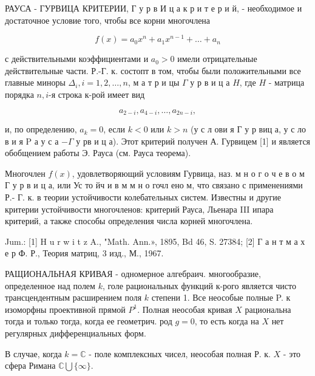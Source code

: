 \documentclass[10pt]{article}
\begin{document}
РАУСА - ГУРВИЦА КРИТЕРИИ, Г у р в И ц а к р и т е р и й, - необходимое и достаточное условие того, чтобы все корни многочлена



\[

f(x)=a_{0} x^{n}+a_{1} x^{n-1}+\ldots+a_{n}

\]



с действительными коэффициентами и $a_{0}>0$ имели отрицательные действительные части. Р.-Г. к. состопт в том, чтобы были положительными все главные миноры $\Delta_{i}, i=1,2, \ldots, n$, м а т р и цы $\Gamma$ у р в и ц а $H$, где $H$ - матрица порядка $n, i$-я строка к-рой имеет вид



\[

a_{2-i}, a_{4-i}, \ldots, a_{2 n-i},

\]



и, по определению, $a_{k}=0$, если $k<0$ или $k>n$ (у с л ови я Г у р виц а, у с ло в и я $\mathrm{P}$ а у с а $-\Gamma$ у рв и ц а). Этот критерий получен А. Гурвицем [1] и является обобщением работы Э. Рауса (см. Рауса теорема).



Многочлен $f(x)$, удовлетворяющий условиям Гурвица, наз. м н о г о ч е в о м Г у р в и ц а, или Ус то йч и в м м н о гочл ено м, что связано с применениями Р.- Г. к. в теории устойчивости колебательных систем. Известны и другие критерии устойчивости многочленов: критерий Рауса, Льенара III ипара критерий, а также способы определения числа корней многочлена.



Jum.: [1] H u r w i t z A., "Math. Ann.», 1895, Bd 46, S. 27384; [2] Г а н т м а х е р Ф. Р., Теория матриц, 3 изд., М., 1967.



РАЩИОНАЛЬНАЯ КРИВАЯ - одномерное алгебраич. многообразие, определенное над полем $k$, голе рациональных функций к-рого является чисто трансцендентным расширением поля $k$ степени 1. Все неособые полные P. к изоморфны проективной прямой $P^{1}$. Полная неособая кривая $X$ рациональна тогда и только тогда, когда ее геометрич. род $g=0$, то есть когда на $X$ нет регулярных дифференциальных форм.



В случае, когда $k=\mathbb{C}$ - поле комплексных чисел, неособая полная Р. к. $X$ - это сфера Римана $\mathbb{C} \bigcup\{\infty\}$.
\end{document}
